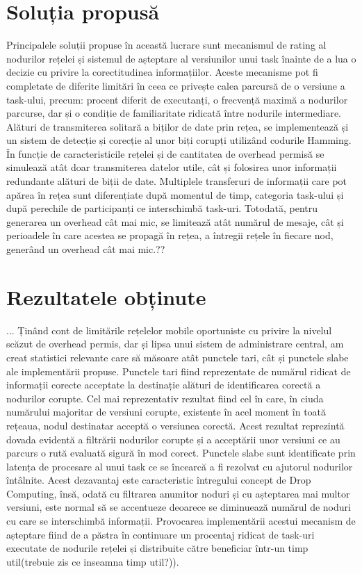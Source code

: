 \documentclass[12pt,a4paper]{report}
\begin{document}
\section{Soluția propusă} 
Principalele soluții propuse în această lucrare sunt mecanismul de rating al nodurilor rețelei și sistemul de așteptare al versiunilor unui task înainte de a lua o decizie cu privire la corectitudinea informațiilor. Aceste mecanisme pot fi completate de diferite limitări în ceea ce privește calea parcursă de o versiune a task-ului, precum: procent diferit de executanți, o frecvență maximă a nodurilor parcurse, dar și o condiție de familiaritate ridicată între nodurile intermediare. Alături de transmiterea solitară a biților de date prin rețea, se implementează și un sistem de detecție și corecție al unor biți corupți utilizând codurile Hamming. În funcție de caracteristicile rețelei și de cantitatea de overhead permisă se simulează atât doar transmiterea datelor utile, cât și folosirea unor informații redundante alături de biții de date. Multiplele transferuri de informații care pot apărea în rețea sunt diferențiate după momentul de timp, categoria task-ului și după perechile de participanți ce interschimbă task-uri. Totodată, pentru generarea un overhead cât mai mic, se limitează atât numărul de mesaje, cât și perioadele în care acestea se propagă în rețea, a întregii rețele în fiecare nod, generând un overhead cât mai mic.??
\section{Rezultatele obținute}
...
Ținând cont de limitările rețelelor mobile oportuniste cu privire la nivelul scăzut de overhead permis, dar și lipsa unui sistem de administrare central, am creat statistici relevante care să măsoare atât punctele tari, cât și punctele slabe ale implementării propuse. Punctele tari fiind reprezentate de numărul ridicat de informații corecte acceptate la destinație alături de identificarea corectă a nodurilor corupte. Cel mai reprezentativ rezultat fiind cel în care, în ciuda numărului majoritar de versiuni corupte, existente în acel moment în toată rețeaua, nodul destinatar acceptă o versiunea corectă. Acest rezultat reprezintă dovada evidentă a filtrării nodurilor corupte și a acceptării unor versiuni ce au parcurs o rută evaluată sigură în mod corect. Punctele slabe sunt identificate prin latența de procesare al unui task ce se încearcă a fi rezolvat cu ajutorul nodurilor întâlnite. Acest dezavantaj este caracteristic întregului concept de Drop Computing, însă, odată cu filtrarea anumitor noduri și cu așteptarea mai multor versiuni, este normal să se accentueze deoarece se diminuează numărul de noduri cu care se interschimbă informații. Provocarea implementării acestui mecanism de așteptare fiind de a păstra în continuare un procentaj ridicat de task-uri executate de nodurile rețelei și distribuite către beneficiar într-un timp util(trebuie zis ce inseamna timp util?)). 
\end{document}
